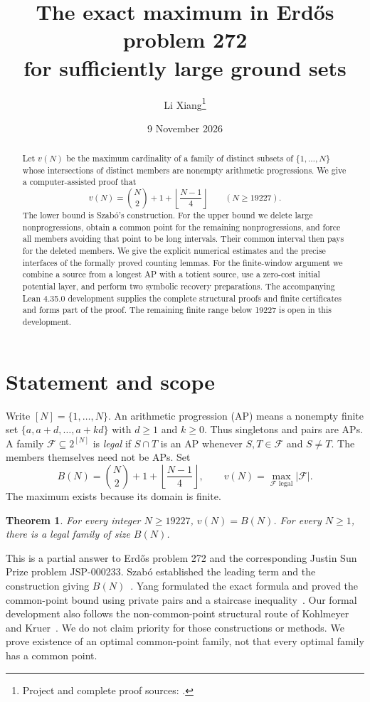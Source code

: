 \documentclass[11pt,a4paper]{article}
\title{The exact maximum in Erd\H{o}s problem 272\protect\\for sufficiently large ground sets}
\author{Li Xiang\thanks{Project and complete proof sources: \repo.}}
\date{9 November 2026}
\newtheorem{theorem}{Theorem}
\theoremstyle{definition}\newtheorem{definition}[theorem]{Definition}
\newcommand{\F}{\mathcal F}
\begin{document}
\maketitle
\begin{abstract}
Let $v(N)$ be the maximum cardinality of a family of distinct subsets of
$\{1,\ldots,N\}$ whose intersections of distinct members are nonempty
arithmetic progressions. We give a computer-assisted proof that
\[
 v(N)=\binom N2+1+\left\lfloor\frac{N-1}{4}\right\rfloor
 \qquad(N\ge 19227).
\]
The lower bound is Szab\'o's construction. For the upper bound we delete
large nonprogressions, obtain a common point for the remaining
nonprogressions, and force all members avoiding that point to be long
intervals. Their common interval then pays for the deleted members.
We give the explicit numerical estimates and the precise interfaces of
the formally proved counting lemmas. For the finite-window argument we
combine a source from a longest AP with a totient source, use a zero-cost
initial potential layer, and perform two symbolic recovery preparations.
The accompanying Lean 4.35.0 development supplies the complete structural
proofs and finite certificates and forms part of the proof. The remaining
finite range below 19227 is open in this development.
\end{abstract}

\section{Statement and scope}
Write $[N]=\{1,\ldots,N\}$. An arithmetic progression (AP) means a
nonempty finite set $\{a,a+d,\ldots,a+kd\}$ with $d\ge1$ and $k\ge0$.
Thus singletons and pairs are APs. A family $\F\subseteq2^{[N]}$ is
\emph{legal} if $S\cap T$ is an AP whenever $S,T\in\F$ and $S\ne T$.
The members themselves need not be APs. Set
\[
 B(N)=\binom N2+1+\left\lfloor\frac{N-1}{4}\right\rfloor,
 \qquad v(N)=\max_{\F\text{ legal}}|\F|.
\]
The maximum exists because its domain is finite.

\begin{theorem}\label{thm:main}
For every integer $N\ge19227$, $v(N)=B(N)$. For every $N\ge1$,
there is a legal family of size $B(N)$.
\end{theorem}

This is a partial answer to Erd\H{o}s problem 272 and the corresponding
Justin Sun Prize problem JSP-000233. Szab\'o established the leading term
and the construction giving $B(N)$~\cite{Szabo}. Yang formulated the exact
formula and proved the common-point bound using private pairs and a
staircase inequality~\cite{Yang}. Our formal development also follows the
non-common-point structural route of Kohlmeyer and Kruer~\cite{KK}.
We do not claim priority for those constructions or methods. We prove
existence of an optimal common-point family, not that every optimal family
has a common point.
\end{document}
